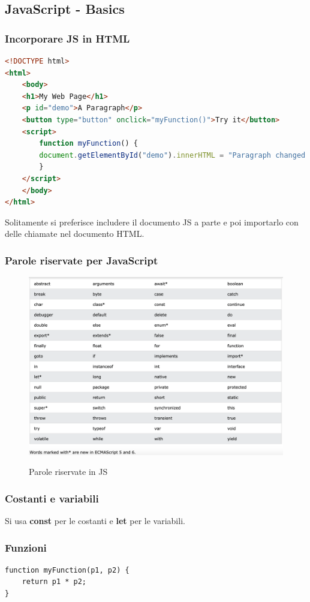 \subsection{JavaScript - Basics}
\subsubsection{Incorporare JS in HTML}
\begin{lstlisting}[language=html]
<!DOCTYPE html>
<html>
    <body>
    <h1>My Web Page</h1>
    <p id="demo">A Paragraph</p>
    <button type="button" onclick="myFunction()">Try it</button>
    <script>
        function myFunction() {
        document.getElementById("demo").innerHTML = "Paragraph changed.";
        }
    </script>
    </body>
</html>
\end{lstlisting}
Solitamente si preferisce includere il documento JS a parte e poi importarlo con delle chiamate nel documento HTML.

\subsubsection{Parole riservate per JavaScript}
\begin{figure}[h!]
    \centering
    \includegraphics[width=0.8\linewidth]{imgs/4 - reserved keyword.png}
    \label{fig:ReserverKeyword}
    \caption{Parole riservate in JS}
\end{figure}

\subsubsection{Costanti e variabili}
Si usa \textbf{const} per le costanti e \textbf{let} per le variabili.

\subsubsection{Funzioni}
\begin{lstlisting}
function myFunction(p1, p2) {
    return p1 * p2;
}
\end{lstlisting}
